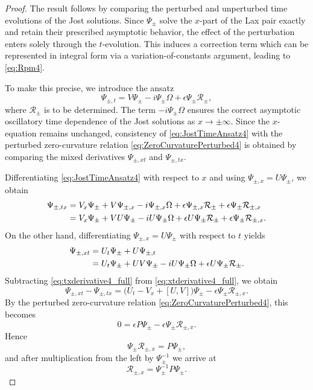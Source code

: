 \documentclass[10pt,a4paper]{amsart}
\begin{document}
\begin{proof}
The result follows by comparing the perturbed and unperturbed time evolutions of the Jost solutions. 
Since $\Psi_\pm$ solve the $x$-part of the Lax pair exactly and retain their prescribed asymptotic behavior, the effect of the perturbation enters solely through the $t$-evolution. 
This induces a correction term which can be represented in integral form via a variation-of-constants argument, leading to \eqref{eq:Rpm4}.

To make this precise, we introduce the ansatz
\begin{equation}
\Psi_{\pm,t}=V\Psi_\pm - i\Psi_\pm \Omega + \epsilon \Psi_\pm \mathcal{R}_\pm,
\label{eq:JostTimeAnsatz4}
\end{equation}
where $\mathcal{R}_\pm$ is to be determined. The term $-i\Psi_\pm\Omega$ ensures the correct asymptotic oscillatory time dependence of the Jost solutions as $x\to\pm\infty$. 
Since the $x$-equation remains unchanged, consistency of \eqref{eq:JostTimeAnsatz4} with the perturbed zero-curvature relation \eqref{eq:ZeroCurvaturePerturbed4} is obtained by comparing the mixed derivatives $\Psi_{\pm,xt}$ and $\Psi_{\pm,tx}$.

Differentiating \eqref{eq:JostTimeAnsatz4} with respect to $x$ and using $\Psi_{\pm,x}=U\Psi_\pm$, we obtain
\begin{align}
\Psi_{\pm,tx}
&=V_x\Psi_\pm + V\Psi_{\pm,x} - i\Psi_{\pm,x}\Omega + \epsilon \Psi_{\pm,x}\mathcal{R}_\pm + \epsilon \Psi_\pm \mathcal{R}_{\pm,x} \notag\\
&=V_x\Psi_\pm + VU\Psi_\pm - iU\Psi_\pm\Omega + \epsilon U\Psi_\pm \mathcal{R}_\pm + \epsilon \Psi_\pm \mathcal{R}_{\pm,x}.
\label{eq:txderivative4_full}
\end{align}
On the other hand, differentiating $\Psi_{\pm,x}=U\Psi_\pm$ with respect to $t$ yields
\begin{align}
\Psi_{\pm,xt}
&=U_t\Psi_\pm + U\Psi_{\pm,t} \notag\\
&=U_t\Psi_\pm + UV\Psi_\pm - iU\Psi_\pm\Omega + \epsilon U\Psi_\pm \mathcal{R}_\pm.
\label{eq:xtderivative4_full}
\end{align}
Subtracting \eqref{eq:txderivative4_full} from \eqref{eq:xtderivative4_full}, we obtain
\begin{equation}
\Psi_{\pm,xt}-\Psi_{\pm,tx}
=
\bigl(U_t - V_x + [U,V]\bigr)\Psi_\pm - \epsilon \Psi_\pm \mathcal{R}_{\pm,x}.
\label{eq:mixeddifference4}
\end{equation}
By the perturbed zero-curvature relation \eqref{eq:ZeroCurvaturePerturbed4}, this becomes
\[
0=\epsilon P\Psi_\pm - \epsilon \Psi_\pm \mathcal{R}_{\pm,x}.
\]
Hence
\begin{equation}
\Psi_\pm \mathcal{R}_{\pm,x}=P\Psi_\pm,
\end{equation}
and after multiplication from the left by $\Psi_\pm^{-1}$ we arrive at
\begin{equation}
\mathcal{R}_{\pm,x} = \Psi_\pm^{-1}P\Psi_\pm.
\label{eq:Rpmx4}
\end{equation}


\end{proof}
\end{document}

